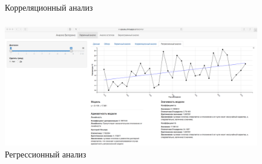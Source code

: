 \documentclass[notheorems]{beamer}
\theoremstyle{definition}
\theoremstyle{example}
\theoremstyle{plain}
\begin{document}
\begin{frame}
  \frametitle{\large\secname}
  \framesubtitle{\subsecname}
  \begin{figure}[h]
    \caption{Корреляционный анализ}
  \end{figure}
\end{frame}

\begin{frame}
  \frametitle{\large\secname}
  \framesubtitle{\subsecname}
    \begin{figure}[h]
    \includegraphics[width=1\textwidth]{../../figures/static/2_regr.png}
    \caption{Регрессионный анализ}
  \end{figure}
\end{frame}
\end{document}
